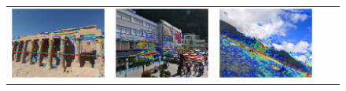\newcommand{\sgbpwidth}{0.2}
\begin{figure}
\centering
\bgroup
\def\arraystretch{0}
\begin{tabular}{@{}c@{}c@{}c@{}c@{}c@{}}
\includegraphics[width=\sgbpwidth\linewidth]{figures/nn_analysis/sgbp/pano_addbhhhqoevobx_jpg-1.png} &
\includegraphics[width=\sgbpwidth\linewidth]{figures/nn_analysis/sgbp/pano_addfjqyibbzulh_jpg-2.png} &
\includegraphics[width=\sgbpwidth\linewidth]{figures/nn_analysis/sgbp/pano_addgasjevqjafh_jpg-1.png} &

\end{tabular}
\end{figure}

